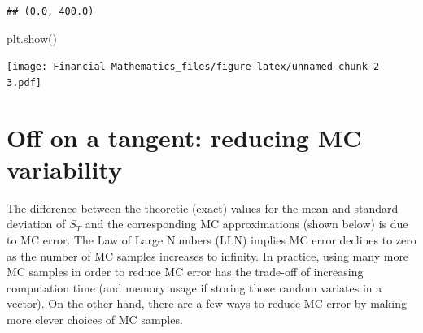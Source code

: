 \documentclass[
]{book}
\newenvironment{Shaded}{\begin{snugshade}}{\end{snugshade}}
\newcommand{\NormalTok}[1]{#1}
\begin{document}
\begin{verbatim}
## (0.0, 400.0)
\end{verbatim}

\begin{Shaded}
\begin{Highlighting}[]
\NormalTok{plt.show()}
\end{Highlighting}
\end{Shaded}

\texttt{[image: Financial-Mathematics\_files/figure-latex/unnamed-chunk-2-3.pdf]}

\hypertarget{off-on-a-tangent-reducing-mc-variability}{%
\section{Off on a tangent: reducing MC variability}\label{off-on-a-tangent-reducing-mc-variability}}

The difference between the theoretic (exact) values for the mean and standard deviation of \(S_T\) and the corresponding MC approximations (shown below) is due to MC error. The Law of Large Numbers (LLN) implies MC error declines to zero as the number of MC samples increases to infinity. In practice, using many more MC samples in order to reduce MC error has the trade-off of increasing computation time (and memory usage if storing those random variates in a vector). On the other hand, there are a few ways to reduce MC error by making more clever choices of MC samples.
\end{document}
